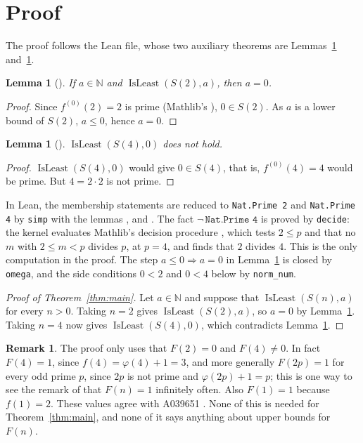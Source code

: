 \documentclass[11pt]{amsart}
\theoremstyle{plain}
\newtheorem{lemma}[theorem]{Lemma}
\theoremstyle{definition}
\newtheorem{remark}[theorem]{Remark}
\newcommand{\N}{\mathbb{N}}
\DeclareMathOperator{\IsLeast}{IsLeast}
\begin{document}
\section{Proof}\label{sec:proof}

The proof follows the Lean file, whose two auxiliary theorems are Lemmas~\ref{lem:two} and~\ref{lem:four}.

\begin{lemma}[]\label{lem:two}
If $a\in\N$ and $\IsLeast(S(2),a)$, then $a=0$.
\end{lemma}

\begin{proof}
Since $f^{(0)}(2)=2$ is prime (Mathlib's ), $0\in S(2)$. As $a$ is a lower bound of $S(2)$, $a\le 0$, hence $a=0$.
\end{proof}

\begin{lemma}[]\label{lem:four}
$\IsLeast(S(4),0)$ does not hold.
\end{lemma}

\begin{proof}
$\IsLeast(S(4),0)$ would give $0\in S(4)$, that is, $f^{(0)}(4)=4$ would be prime. But $4=2\cdot 2$ is not prime.
\end{proof}

In Lean, the membership statements are reduced to \texttt{Nat.Prime 2} and \texttt{Nat.Prime 4} by \texttt{simp} with the lemmas ,  and . The fact $\neg\,\texttt{Nat.Prime 4}$ is proved by \texttt{decide}: the kernel evaluates Mathlib's decision procedure , which tests $2\le p$ and that no $m$ with $2\le m<p$ divides $p$, at $p=4$, and finds that $2$ divides $4$. This is the only computation in the proof. The step $a\le 0\Rightarrow a=0$ in Lemma~\ref{lem:two} is closed by \texttt{omega}, and the side conditions $0<2$ and $0<4$ below by \texttt{norm\_num}.

\begin{proof}[Proof of Theorem~\ref{thm:main}]
Let $a\in\N$ and suppose that $\IsLeast(S(n),a)$ for every $n>0$. Taking $n=2$ gives $\IsLeast(S(2),a)$, so $a=0$ by Lemma~\ref{lem:two}. Taking $n=4$ now gives $\IsLeast(S(4),0)$, which contradicts Lemma~\ref{lem:four}.
\end{proof}

\begin{remark}
The proof only uses that $F(2)=0$ and $F(4)\ne 0$. In fact $F(4)=1$, since $f(4)=\varphi(4)+1=3$, and more generally $F(2p)=1$ for every odd prime $p$, since $2p$ is not prime and $\varphi(2p)+1=p$; this is one way to see the remark of \cite{EP409} that $F(n)=1$ infinitely often. Also $F(1)=1$ because $f(1)=2$. These values agree with A039651 \cite{OEIS-A039651}. None of this is needed for Theorem~\ref{thm:main}, and none of it says anything about upper bounds for $F(n)$.
\end{remark}
\end{document}

